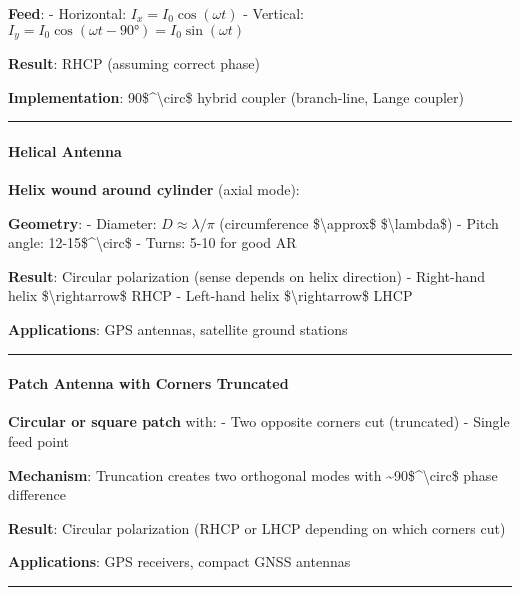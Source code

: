 \textbf{Feed}: - Horizontal: \(I_x = I_0 \cos(\omega t)\) - Vertical:
\(I_y = I_0 \cos(\omega t - 90°) = I_0 \sin(\omega t)\)

\textbf{Result}: RHCP (assuming correct phase)

\textbf{Implementation}: 90\$\^{}\textbackslash circ\$ hybrid coupler
(branch-line, Lange coupler)

\begin{center}\rule{0.5\linewidth}{0.5pt}\end{center}

\paragraph{Helical Antenna}\label{helical-antenna}

\textbf{Helix wound around cylinder} (axial mode):

\textbf{Geometry}: - Diameter: \(D \approx \lambda/\pi\) (circumference
\$\textbackslash approx\$ \$\textbackslash lambda\$) - Pitch angle:
12-15\$\^{}\textbackslash circ\$ - Turns: 5-10 for good AR

\textbf{Result}: Circular polarization (sense depends on helix
direction) - Right-hand helix \$\textbackslash rightarrow\$ RHCP -
Left-hand helix \$\textbackslash rightarrow\$ LHCP

\textbf{Applications}: GPS antennas, satellite ground stations

\begin{center}\rule{0.5\linewidth}{0.5pt}\end{center}

\paragraph{Patch Antenna with Corners
Truncated}\label{patch-antenna-with-corners-truncated}

\textbf{Circular or square patch} with: - Two opposite corners cut
(truncated) - Single feed point

\textbf{Mechanism}: Truncation creates two orthogonal modes with
\textasciitilde90\$\^{}\textbackslash circ\$ phase difference

\textbf{Result}: Circular polarization (RHCP or LHCP depending on which
corners cut)

\textbf{Applications}: GPS receivers, compact GNSS antennas

\begin{center}\rule{0.5\linewidth}{0.5pt}\end{center}

